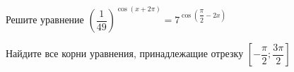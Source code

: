 \begin{ex}
	\begin{condition}
		\begin{enumcols}[label=\asbuk*)]
			\item Решите уравнение \( \left(\dfrac{1}{49}\right)^{\cos{\left(x + 2\pi\right)}} = 7^{\cos \left(\dfrac{\pi}{2}-2x  \right)} \)
			\item Найдите все корни уравнения, принадлежащие отрезку \( \left[-\dfrac{\pi}{2};\dfrac{3\pi}{2}\right] \)
		\end{enumcols}
	\end{condition}
\end{ex}